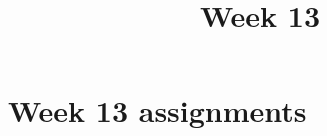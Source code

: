 \documentclass{xourse}
\title{Week 13}
\begin{document}
\begin{abstract}
\end{abstract}
\maketitle

\part{Week 13 assignments}
\end{document}

